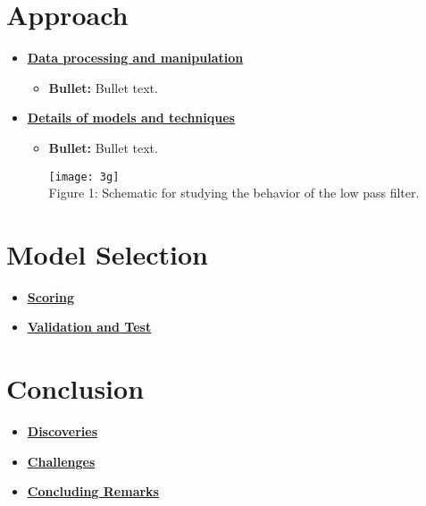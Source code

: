\documentclass[11pt]{article}
\newcommand{\boldline}[1]{\underline{\textbf{#1}}}
\begin{document}
	\section{Approach}
	\medskip
	\begin{itemize}
		
		\item \boldline{Data processing and manipulation}
		\begin{itemize}
			\item \textbf{Bullet:} Bullet text.
		\end{itemize}
		
		\item \boldline{Details of models and techniques}
		\begin{itemize}
			\item \textbf{Bullet:} Bullet text.
			
			\begin{center}
				\texttt{[image: 3g]}\\
				Figure 1: Schematic for studying the behavior of the low pass filter.
			\end{center}
			
		\end{itemize}
		
	\end{itemize}
	
	
	
	\section{Model Selection}
	\medskip
	\begin{itemize}
		
		\item \boldline{Scoring} \\
		
		\item \boldline{Validation and Test} \\
		
	\end{itemize}
	
	
	
	\section{Conclusion}
	\medskip
	\begin{itemize}
		
		\item \boldline{Discoveries} \\
		
		\item \boldline{Challenges} \\
		
		\item \boldline{Concluding Remarks} \\
		
	\end{itemize}
	
	
	
\end{document}
